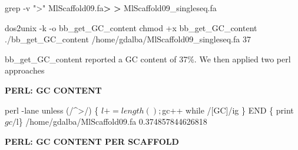 \documentclass[
]{article}
\newenvironment{Shaded}{\begin{snugshade}}{\end{snugshade}}
\newcommand{\ExtensionTok}[1]{#1}
\newcommand{\FunctionTok}[1]{\textcolor[rgb]{0.00,0.00,0.00}{#1}}
\newcommand{\NormalTok}[1]{#1}
\newcommand{\OperatorTok}[1]{\textcolor[rgb]{0.81,0.36,0.00}{\textbf{#1}}}
\newcommand{\StringTok}[1]{\textcolor[rgb]{0.31,0.60,0.02}{#1}}
\begin{document}
\begin{Shaded}
\begin{Highlighting}[]

\FunctionTok{grep}\NormalTok{ {-}v }\StringTok{"\textgreater{}"}\NormalTok{ MlScaffold09.fa}\OperatorTok{\textgreater{}} \OperatorTok{\textgreater{}}\NormalTok{ MlScaffold09\_singleseq.fa}
\end{Highlighting}
\end{Shaded}

\begin{Shaded}
\begin{Highlighting}[]

\ExtensionTok{dos2unix}\NormalTok{ {-}k {-}o bb\_get\_GC\_content}
\FunctionTok{chmod}\NormalTok{ +x bb\_get\_GC\_content}
\ExtensionTok{./bb\_get\_GC\_content}\NormalTok{ /home/gdalba/MlScaffold09\_singleseq.fa}
\ExtensionTok{37}
\end{Highlighting}
\end{Shaded}

bb\_get\_GC\_content reported a GC content of 37\%. We then applied two
perl approaches

\textbf{PERL: GC CONTENT}

\begin{Shaded}
\begin{Highlighting}[]

\FunctionTok{perl}\NormalTok{ {-}lane }\StringTok{\textquotesingle{}unless (/\^{}\textgreater{}/) \{ $l += length(); $gc++ while /[GC]/ig \} END \{ print $gc/$l\}\textquotesingle{}}\NormalTok{ /home/gdalba/MlScaffold09.fa}
\ExtensionTok{0.374857844626818}
\end{Highlighting}
\end{Shaded}

\textbf{PERL: GC CONTENT PER SCAFFOLD}

\begin{Shaded}
\end{Shaded}
\end{document}
